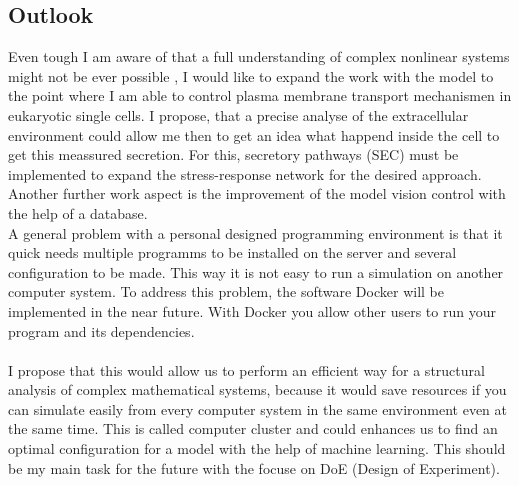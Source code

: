 \subsection{Outlook}
Even tough I am aware of that a full understanding of complex nonlinear systems might not be ever possible \cite{Noell2018}, 
I would like to expand the work with the model to the point where I am able to control plasma membrane transport mechanismen in eukaryotic single cells. I propose, that a precise analyse of the extracellular environment could allow me then to get an idea what happend inside the cell to get this meassured secretion. For this, secretory pathways (SEC) must be implemented to expand the stress-response network for the desired approach.\\
Another further work aspect is the improvement of the model vision control with the help of a database. \\
A general problem with a personal designed programming environment is that it quick needs multiple programms to be installed on the server and several configuration to be made. This way it is not easy to run a simulation on another computer system. To address this problem, the software Docker will be implemented in the near future. With Docker you allow other users to run your program and its dependencies. \\\\I propose that this would allow us to perform an efficient way for a structural analysis of complex mathematical systems, because it would save resources if you can simulate easily from every computer system in the same environment even at the same time. This is called computer cluster and could enhances us to find an optimal configuration for a model with the help of machine learning. This should be my main task for the future with the focuse on DoE (Design of Experiment).
